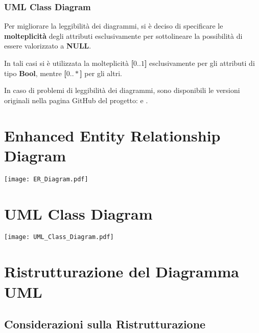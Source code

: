 \subsubsection{UML Class Diagram}

Per migliorare la leggibilità dei diagrammi, si è deciso di specificare le \textbf{molteplicità} degli attributi esclusivamente per sottolineare la possibilità di essere valorizzato a \textbf{NULL}. 

In tali casi si è utilizzata la molteplicità \textbf{[\(0..1\)]} esclusivamente per gli attributi di tipo \textbf{Bool}, mentre \textbf{[\(0..*\)]} per gli altri.

\bigskip

\begin{note}
  In caso di problemi di leggibilità dei diagrammi, sono disponibili le versioni originali nella pagina GitHub del progetto:
   e .
\end{note}

\newpage

\section{Enhanced Entity Relationship Diagram}
\begin{center}
  \texttt{[image: ER\_Diagram.pdf]}
\end{center}

\section{UML Class Diagram}
\begin{center}
  \texttt{[image: UML\_Class\_Diagram.pdf]}
\end{center}

\newpage

\section{Ristrutturazione del Diagramma UML}

\subsection{Considerazioni sulla Ristrutturazione}

